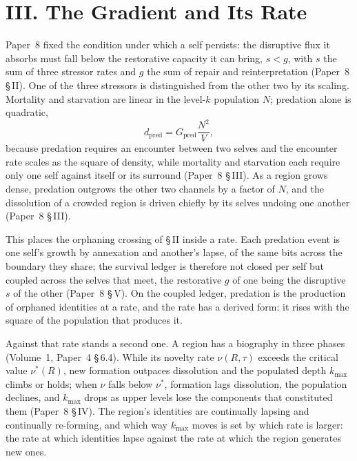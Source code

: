 \documentclass[11pt,oneside]{report}
\theoremstyle{definition}
\theoremstyle{remark}
\begin{document}
\section*{III. The Gradient and Its Rate}

Paper~8 fixed the condition under which a self persists: the disruptive flux it absorbs must fall below the restorative capacity it can bring, \ensuremath{s < g}, with \ensuremath{s} the sum of three stressor rates and \ensuremath{g} the sum of repair and reinterpretation (Paper~8 \S\,II). One of the three stressors is distinguished from the other two by its scaling. Mortality and starvation are linear in the level-\ensuremath{k} population \ensuremath{N}; predation alone is quadratic,
\[
d_{\mathrm{pred}} = G_{\mathrm{pred}}\frac{N^2}{V},
\]
because predation requires an encounter between two selves and the encounter rate scales as the square of density, while mortality and starvation each require only one self against itself or its surround (Paper~8 \S\,III). As a region grows dense, predation outgrows the other two channels by a factor of \ensuremath{N}, and the dissolution of a crowded region is driven chiefly by its selves undoing one another (Paper~8 \S\,III).

This places the orphaning crossing of \S\,II inside a rate. Each predation event is one self's growth by annexation and another's lapse, of the same bits across the boundary they share; the survival ledger is therefore not closed per self but coupled across the selves that meet, the restorative \ensuremath{g} of one being the disruptive \ensuremath{s} of the other (Paper~8 \S\,V). On the coupled ledger, predation is the production of orphaned identities at a rate, and the rate has a derived form: it rises with the square of the population that produces it.

Against that rate stands a second one. A region has a biography in three phases (Volume~1, Paper~4 \S\,6.4). While its novelty rate \ensuremath{\nu(R,\tau)} exceeds the critical value \ensuremath{\nu^*(R)}, new formation outpaces dissolution and the populated depth \ensuremath{k_{\max}} climbs or holds; when \ensuremath{\nu} falls below \ensuremath{\nu^*}, formation lags dissolution, the population declines, and \ensuremath{k_{\max}} drops as upper levels lose the components that constituted them (Paper~8 \S\,IV). The region's identities are continually lapsing and continually re-forming, and which way \ensuremath{k_{\max}} moves is set by which rate is larger: the rate at which identities lapse against the rate at which the region generates new ones.
\end{document}
